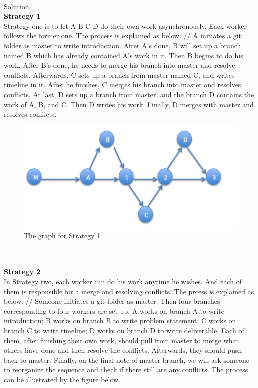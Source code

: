 \documentclass[12pt]{article}
\begin{document}
\newpage
\noindent\ \\Solution:\\
\textbf{Strategy 1}\\
Strategy one is to let A B C D do their own work asynchronously. Each worker follows the former one. The process is explained as below: //
 A initiates a git folder as master to write introduction. After A\textquoteright s done, B will set up a branch named B which has already contained A\textquoteright s work in it. Then B begins to do his work. After B\textquoteright s done, he needs to merge his branch into master and resolve conflicts. Afterwards, C sets up a branch from master named C, and writes timeline in it. After he finishes, C merges his branch into master and resolves conflicts. At last, D sets up a branch from master, and the branch D contains the work of A, B, and C. Then D writes his work. Finally, D merges with master and resolves conflicts. 
\begin{figure}[h]
    \begin{center}
        \includegraphics[scale=0.6]{s1.png}
    \end{center}
    \caption{The graph for Strategy 1}
    \label{fig:branch}
\end{figure}
\\
\\
\textbf{Strategy 2}\\
In Strategy two, each worker can do his work anytime he wishes. And each of them is responsible for a merge and resolving conflicts. The prcess is explained as below: //
Someone initiates a git folder as master. Then four branches corresponding to four workers are set up. A works on branch A to write introduction; B works on branch B to write problem statement; C works on branch C to write timeline; D works on branch D to write deliverable. Each of them, after finishing their own work, should pull from master to merge what others have done and then resolve the conflicts. Afterwards, they should push back to master. Finally, on the final note of master branch, we will ask someone to reorganize the sequence and check if there still are any conflicts. The process can be illustrated by the figure below.
\end{document}
